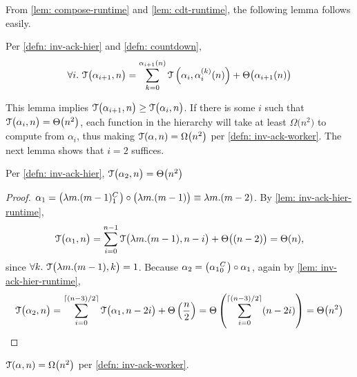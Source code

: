 From \cref{lem: compose-runtime} and \cref{lem: cdt-runtime}, the following lemma follows easily.
\begin{lem} \label{lem: inv-ack-hier-runtime}
	Per \cref{defn: inv-ack-hier} and \cref{defn: countdown}, 
	\begin{equation*}
	\forall i.~\mathcal{T}\big(\alpha_{i+1}, n\big) = \sum_{k=0}^{\alpha_{i+1}(n)}\mathcal{T}\left(\alpha_i, \alpha_i^{(k)}(n)\right) + \Theta\big(\alpha_{i+1}(n)\big)
	\end{equation*}
\end{lem}
This lemma implies $\mathcal{T}\big(\alpha_{i+1}, n\big) \ge \mathcal{T}\big(\alpha_i, n\big)$. If there is some $i$ such that $\mathcal{T}\big(\alpha_i, n\big) = \Theta\big(n^2\big)$, each function in the hierarchy will take at least $\Omega\big(n^2\big)$ to compute {\color{red}from} $\alpha_i$, thus making $\mathcal{T}(\alpha, n) = \Omega\big(n^2\big)$ per \cref{defn: inv-ack-worker}. The next lemma shows that $i = 2$ suffices.
\begin{lem}
	Per \cref{defn: inv-ack-hier}, $\mathcal{T}\big(\alpha_2, n\big) = \Theta\big(n^2\big)$ 
\end{lem}
\begin{proof}
	$\alpha_1 = \big(\cdt{\lambda m.(m-1)}{1}\big)\circ \big(\lambda m.(m-1)\big) \equiv \lambda m.(m - 2)$. By \cref{lem: inv-ack-hier-runtime},
	\begin{equation*}
	\mathcal{T}\big(\alpha_1, n\big) = \sum_{i=0}^{n-1} \mathcal{T}\big(\lambda m.(m-1), n - i\big) + \Theta\big((n-2)\big) = \Theta(n)\text{,}
	\end{equation*}
	since $\forall k.~\mathcal{T}\big(\lambda m.(m-1), k\big) = 1$. Because $\alpha_2 = \big(\cdt{\alpha_1}{0}\big)\circ \alpha_1 $, again by \cref{lem: inv-ack-hier-runtime},
	\begin{equation*}
	\mathcal{T}\big(\alpha_2, n\big)
	= \sum_{i=0}^{\lceil (n-3)/2 \rceil} \mathcal{T} \big(\alpha_1, n-2i\big) + \Theta\left(\frac{n}{2}\right)
	= \Theta\left( \sum_{i=0}^{\lceil (n-3)/2 \rceil}(n - 2i) \right)
	= \Theta\big(n^2\big)
	\end{equation*}
\end{proof}
\begin{col}
	$\mathcal{T}(\alpha, n) = \Omega\big(n^2\big)$ per \cref{defn: inv-ack-worker}.
\end{col}

